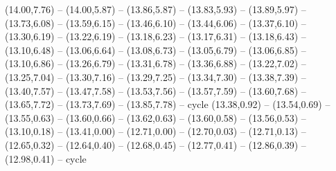 \expandafter\def\csname geo:gebiet:KAZ\endcsname{
  (14.00,7.76) -- (14.00,5.87) -- (13.86,5.87) -- (13.83,5.93) -- (13.89,5.97) -- (13.73,6.08) -- (13.59,6.15) -- (13.46,6.10) -- (13.44,6.06) -- (13.37,6.10) -- (13.30,6.19) -- (13.22,6.19) -- (13.18,6.23) -- (13.17,6.31) -- (13.18,6.43) -- (13.10,6.48) -- (13.06,6.64) -- (13.08,6.73) -- (13.05,6.79) -- (13.06,6.85) -- (13.10,6.86) -- (13.26,6.79) -- (13.31,6.78) -- (13.36,6.88) -- (13.22,7.02) -- (13.25,7.04) -- (13.30,7.16) -- (13.29,7.25) -- (13.34,7.30) -- (13.38,7.39) -- (13.40,7.57) -- (13.47,7.58) -- (13.53,7.56) -- (13.57,7.59) -- (13.60,7.68) -- (13.65,7.72) -- (13.73,7.69) -- (13.85,7.78) -- cycle}
\expandafter\def\csname geo:gebiet:JOR\endcsname{
  (13.38,0.92) -- (13.54,0.69) -- (13.55,0.63) -- (13.60,0.66) -- (13.62,0.63) -- (13.60,0.58) -- (13.56,0.53) -- (13.10,0.18) -- (13.41,0.00) -- (12.71,0.00) -- (12.70,0.03) -- (12.71,0.13) -- (12.65,0.32) -- (12.64,0.40) -- (12.68,0.45) -- (12.77,0.41) -- (12.86,0.39) -- (12.98,0.41) -- cycle}
